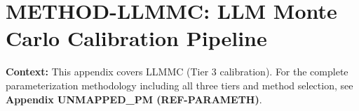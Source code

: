 
\chapter{METHOD-LLMMC: LLM Monte Carlo Calibration Pipeline}
\label{app:iii-llmmc}


\begin{abstract}
How can we convert LLM-generated effect estimates into reliable, calibrated parameters
for intervention design? This appendix presents the LLMMC (LLM Monte Carlo) pipeline:
a complete methodology for (1) eliciting effect estimates from LLMs, (2) calibrating
them against Tier-1/2 empirical anchors, (3) mapping to a unified $\theta \in [0,1]$ scale,
(4) computing R-Scores with Monte Carlo uncertainty propagation, and (5) generating
GO/PILOT/NO-GO decisions. The pipeline is empirically validated with 5/5 deployment
checks passed for both d/SMD and percentage-point scales.
\end{abstract}

\textbf{Context:} This appendix covers LLMMC (Tier 3 calibration). For the complete parameterization methodology including all three tiers and method selection, see \textbf{Appendix UNMAPPED_PM (REF-PARAMETH)}.


